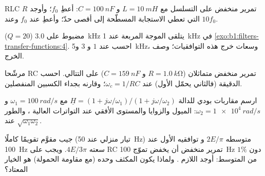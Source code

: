 \begin{exercise}[$\star\star$]\label{exo:b1:filters-transfer-functions:7}
 RLC تمرير منخفض على التسلسل مع $L = \qty{10}{mH}$ و $C = \qty{100}{nF}$: أعطِ
$f_0$؛ وأوجد $R$ التي تعطي الاستجابة المسطّحة إلى أقصى حدّ؛ وأعطِ 
 عند $f_0$ وعند $10f_0$.
\end{exercise}

\begin{exercise}[$\star\star$]\label{exo:b1:filters-transfer-functions:8}
 ($Q = 20$) مضبوط على \qty{3.0}{kHz} يتلقى الموجة المربعة عند
\qty{1}{kHz} في \cref{exo:b1:filters-transfer-functions:4}. احسب
 عند $1$ و $3$ و\qty{5}{kHz}، وسعات خرج هذه
التوافقيات؛ وصف الخرج.
\end{exercise}

\begin{exercise}[$\star\star$]\label{exo:b1:filters-transfer-functions:9}
مرشّحا RC تمرير منخفض متماثلان ($R = \qty{1.0}{k\ohm}$ و $C = \qty{159}{nF}$)
على التتالي. احسب  الدقيقة (فالثاني يحمّل
الأول)  عند $\omega_c = 1/RC$؛ وقارنه بجداء
الكسبين المنفصلين.
\end{exercise}

\begin{exercise}[$\star\star\star$]\label{exo:b1:filters-transfer-functions:10}
ارسم مقاربات بودي للدالة $\underline H = (1 + j\omega/\omega_1)/
(1 + j\omega/\omega_2)$ مع $\omega_1 = \qty{100}{rad/s}$ و $\omega_2 =
\qty{1e4}{rad/s}$: الميول والزوايا والمستوى الأفقي عند التواترات العالية
، والطور عند $\sqrt{\omega_1\omega_2}$.
\end{exercise}

\begin{exercise}[$\star\star\star$]\label{exo:b1:filters-transfer-functions:11}
جيب مقوَّم تقويمًا كاملًا (تيار منزلي عند \qty{50}{Hz}) متوسطه $2E/\pi$ و
توافقيه الأول عند \qty{100}{Hz} سعته $4E/3\pi$. ويجب على  RC
تمرير منخفض أن يخفض تموّج \qty{100}{Hz} دون $1\%$ من
المتوسط: أوجد  اللازم . ولماذا يكون
المكثف وحده (مع مقاومة الحمولة) هو الخيار المعتاد؟
\end{exercise}

